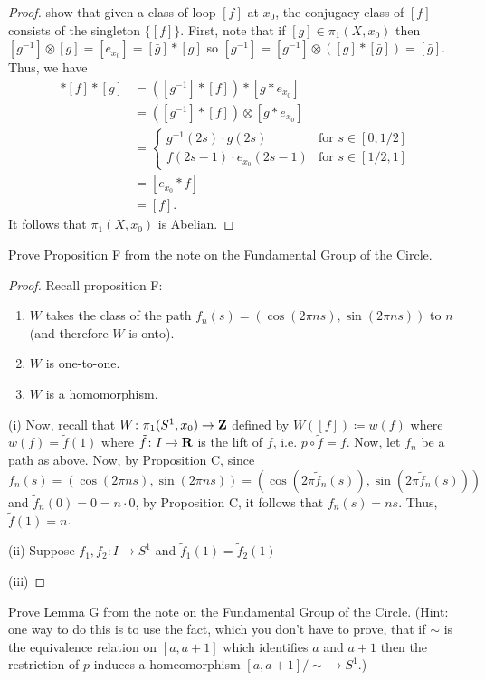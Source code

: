 \begin{proof}
show that given a class of loop $[f]$ at $x_0$, the conjugacy class of
$[f]$ consists of the singleton $\{[f]\}$. First, note that if
$[g]\in\pi_1(X,x_0)$ then $[g^{-1}]\otimes [g]=[e_{x_0}]=[\bar g]*[g]$ so
$[g^{-1}]=[g^{-1}]\otimes ([g]*[\bar g])=[\bar g]$. Thus, we have
\begin{align*}
[\bar g]*[f]*[g]
&=\left([g^{-1}]*[f]\right)*[g*e_{x_0}]\\
&=\left([g^{-1}]*[f]\right)\otimes [g*e_{x_0}]\\
&=\begin{cases}
g^{-1}(2s)\cdot g(2s)&\text{for $s\in[0,1/2]$}\\
f(2s-1)\cdot e_{x_0}(2s-1)&\text{for $s\in[1/2,1]$}
\end{cases}\\
&=[e_{x_0}*f]\\
&=[f].
\end{align*}
It follows that $\pi_1(X,x_0)$ is Abelian.
\end{proof}
\newpage
\begin{problem}[(A)]
Prove Proposition F from the note on the Fundamental Group of the
Circle.
\end{problem}
\begin{proof}
Recall proposition F:
\begin{proposition*}[F]
\begin{enumerate}[label={\normalfont(\roman*)}]
\item $W$ takes the class of the path $f_n(s)=(\cos(2\pi ns),\sin(2\pi
  ns))$ to $n$ (and therefore $W$ is onto).
\item $W$ is one-to-one.
\item $W$ is a homomorphism.
\end{enumerate}
\end{proposition*}
(i) Now, recall that $W\colon\pi_1(S^1,x_0)\to\mathbf{Z}$ defined by
$W([f])\coloneqq w(f)$ where $w(f)=\tilde f(1)$ where $\tilde f\colon
I\to\mathbf{R}$ is the lift of $f$, i.e. $p\circ \tilde f=f$. Now, let $f_n$ be a
path as above. Now, by Proposition C, since
\[
f_n(s)=(\cos(2\pi ns),\sin(2\pi ns))=(\cos(2\pi\tilde
f_n(s)),\sin(2\pi\tilde f_n(s)))
\]
and $\tilde f_n(0)=0=n\cdot 0$, by Proposition C, it follows that
$f_n(s)=ns$. Thus, $\tilde f(1)=n$.

(ii) Suppose $f_1,f_2\colon I\to S^1$ and $\tilde f_1(1)=\tilde f_2(1)$

(iii)
\end{proof}
\newpage
\begin{problem}[(B)]
Prove Lemma G from the note on the Fundamental Group of the Circle. (Hint:
one way to do this is to use the fact, which you don’t have to prove, that
if $\sim$ is the equivalence relation on $[a,a+1]$ which identifies $a$ and
$a+1$ then the restriction of $p$ induces a homeomorphism
$[a,a+1]/{\sim}\to S^1$.)
\end{problem}
